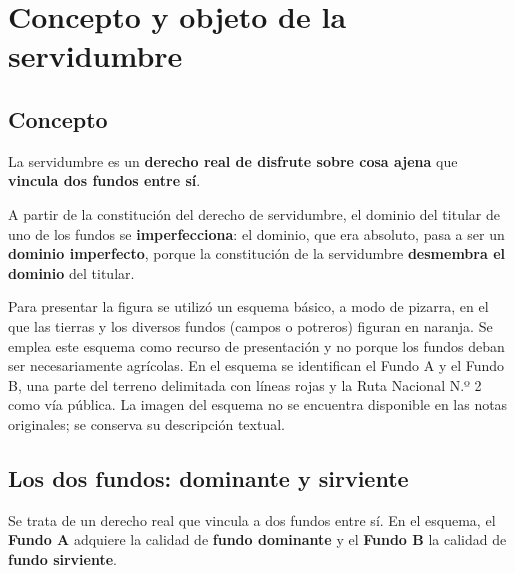 \documentclass[12pt,oneside]{book}
\begin{document}
\tableofcontents


\chapter[Concepto y objeto]{Concepto y objeto de la servidumbre}

\section{Concepto}

La servidumbre es un \textbf{derecho real de disfrute sobre cosa ajena} que \textbf{vincula dos fundos entre sí}.

A partir de la constitución del derecho de servidumbre, el dominio del titular de uno de los fundos se \textbf{imperfecciona}: el dominio, que era absoluto, pasa a ser un \textbf{dominio imperfecto}, porque la constitución de la servidumbre \textbf{desmembra el dominio} del titular.

\begin{note}
Para presentar la figura se utilizó un esquema básico, a modo de pizarra, en el que las tierras y los diversos fundos (campos o potreros) figuran en naranja. Se emplea este esquema como recurso de presentación y no porque los fundos deban ser necesariamente agrícolas. En el esquema se identifican el Fundo A y el Fundo B, una parte del terreno delimitada con líneas rojas y la Ruta Nacional N.º 2 como vía pública. La imagen del esquema no se encuentra disponible en las notas originales; se conserva su descripción textual.
\end{note}

\section{Los dos fundos: dominante y sirviente}

Se trata de un derecho real que vincula a dos fundos entre sí. En el esquema, el \textbf{Fundo A} adquiere la calidad de \textbf{fundo dominante} y el \textbf{Fundo B} la calidad de \textbf{fundo sirviente}.
\end{document}
